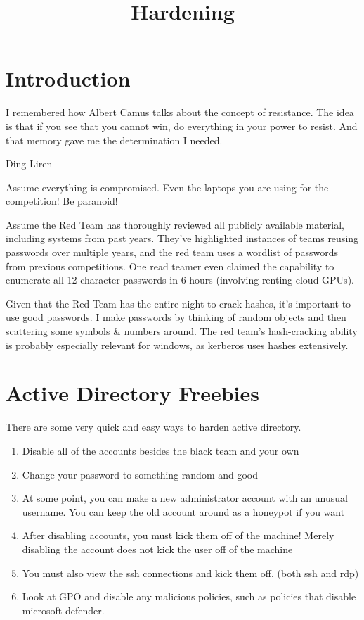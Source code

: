 \documentclass{article}
\title{Hardening}
\begin{document}
\maketitle

\graphicspath{ {./Images/} }
\tableofcontents

\section{Introduction}
\epigraph{I remembered how Albert Camus talks about the concept of resistance. 
The idea is that if you see that you cannot win, do everything in your power to resist. And that memory gave me the determination I needed.}
{Ding Liren}

Assume everything is compromised. Even the laptops you are using for the competition! Be paranoid!

Assume the Red Team has thoroughly reviewed all publicly available material, 
including systems from past years. They've highlighted instances of 
teams reusing passwords over multiple years, and the red team uses a wordlist of 
passwords from previous competitions. One read teamer even claimed the capability to 
enumerate all 12-character passwords in 6 hours (involving renting cloud GPUs). 

Given that the Red Team has 
the entire night to crack hashes, it's important to use good passwords.
I make passwords by thinking of random objects and then scattering some symbols \& numbers around.
The red team's hash-cracking ability is probably especially relevant for windows, 
as kerberos uses hashes extensively. 

\section{Active Directory Freebies}
There are some very quick and easy ways to harden active directory.

\begin{enumerate}
        \item Disable all of the accounts besides the black team and your own
        \item Change your password to something random and good
        \item At some point, you can make a new administrator account with an unusual username. You can keep the old account around as a honeypot if you want
        \item After disabling accounts, you must kick them off of the machine! Merely disabling the account does not kick the user off of the machine
        \item You must also view the ssh connections and kick them off. (both ssh and rdp)
        \item Look at GPO and disable any malicious policies, such as policies that disable microsoft defender.
\end{enumerate}
\end{document}
